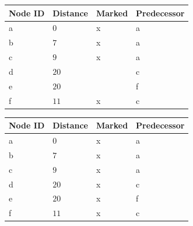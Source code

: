 \begin{frame}[fragile]
{\begin{tabular}{l|l|l|l}
Node ID & Distance & Marked & Predecessor\\
\hline
a & $0$ & x & a\\
b & $7$ & x & a\\
c & $9$ & x & a\\
d & $20$ & & c\\
e & $20$ & & f\\
f & $11$ & x & c\\
\end{tabular}
\begin{tabular}{l|l|l|l}
Node ID & Distance & Marked & Predecessor\\
\hline
a & $0$ & x & a\\
b & $7$ & x & a\\
c & $9$ & x & a\\
d & $20$ & x & c\\
e & $20$ & x & f\\
f & $11$ & x & c\\
\end{tabular}
}
\end{frame}


